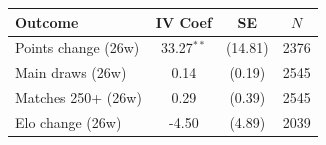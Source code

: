 \begin{tabular}{lccc}
\toprule
Outcome & IV Coef & SE & $N$ \\
\midrule
Points change (26w) & 33.27$^{**}$ & (14.81) & 2376 \\
Main draws (26w) & 0.14 & (0.19) & 2545 \\
Matches 250+ (26w) & 0.29 & (0.39) & 2545 \\
Elo change (26w) & -4.50 & (4.89) & 2039 \\
\bottomrule
\end{tabular}
